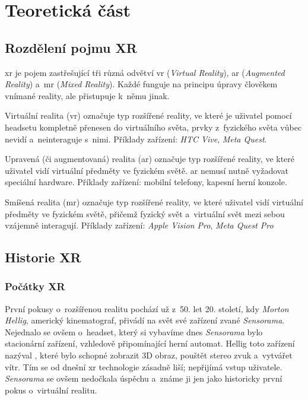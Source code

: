 \part{Teoretická část}

\chapter{Rozdělení pojmu XR}

\gls{xr} je pojem zastřešující tři různá odvětví \poml \gls{vr} (\textit{Virtual Reality}), \gls{ar} (\textit{Augmented Reality}) a~\gls{mr} (\textit{Mixed Reality}). Každé funguje na principu úpravy člověkem vnímané reality, ale přistupuje k~němu jinak.

Virtuální realita (\gls{vr}) označuje typ rozšířené reality, ve které je uživatel pomocí headsetu kompletně přenesen do virtuálního světa, prvky z~fyzického světa vůbec nevidí a~neinteraguje s~nimi. Příklady zařízení: \textit{HTC Vive}, \textit{Meta Quest}.

Upravená (či augmentovaná) realita (\gls{ar}) označuje typ rozšířené reality, ve které uživatel vidí virtuální předměty ve fyzickém světě. \gls{ar} nemusí nutně vyžadovat speciální hardware. Příklady zařízení: mobilní telefony, kapesní herní konzole.

Smíšená realita (\gls{mr}) označuje typ rozšířené reality, ve které uživatel vidí virtuální předměty ve fyzickém světě, přičemž fyzický svět a~virtuální svět mezi sebou vzájemně interagují. Příklady zařízení: \textit{Apple Vision Pro}, \textit{Meta Quest Pro} \cite{xr_disambiguation}

\chapter{Historie XR}

\section{Počátky XR}

První pokusy o~rozšířenou realitu pochází už z~50. let 20. století, kdy \textit{Morton Hellig}, americký kinematograf, přivádí na svět své zařízení zvané \textit{Sensorama}. Nejednalo se ovšem o~headset, který si vybavíme dnes \poml \textit{Sensorama} bylo stacionární zařízení, vzhledově připomínající herní automat. Hellig toto zařízení nazýval , které bylo schopné zobrazit 3D obraz, pouštět stereo zvuk a~vytvářet vítr. Tím se od dnešní \gls{xr} technologie zásadně liší; nepřijímá vstup uživatele. \textit{Sensorama} se ovšem nedočkala úspěchu a~známe ji jen jako historicky první pokus o~virtuální realitu. \cite{otechnice}

